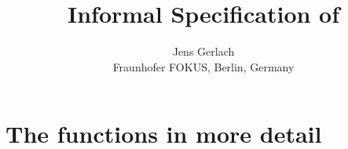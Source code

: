 \documentclass[paper=a4,DIV15,oneside,lefteqn,american]{scrreprt}
\title{Informal Specification of \bitwalker}
\author{Jens Gerlach\\
        {\small Fraunhofer FOKUS, Berlin, Germany}
       }
\date{}
\begin{document}
\maketitle
\thispagestyle{empty}

\tableofcontents
\clearpage
\listoffixmes



\chapter{The \bitwalker functions in more detail}


\end{document}
